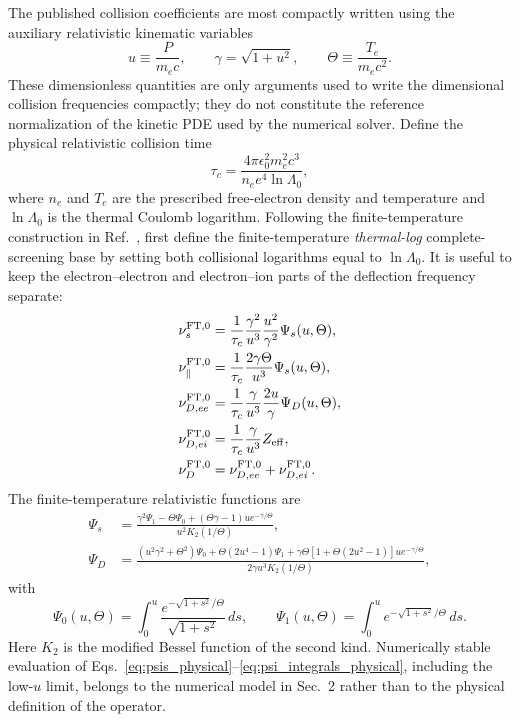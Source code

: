 \documentclass[11pt]{article}
\begin{document}
The published collision coefficients are most compactly written using the auxiliary
relativistic kinematic variables
\begin{equation}
 u\equiv\frac{P}{m_ec},
 \qquad
 \gamma=\sqrt{1+u^2},
 \qquad
 \Theta\equiv\frac{T_e}{m_ec^2}.
 \label{eq:collision_auxiliary_variables}
\end{equation}
These dimensionless quantities are only arguments used to write the dimensional collision
frequencies compactly; they do not constitute the reference normalization of the kinetic
PDE used by the numerical solver.  Define the physical relativistic collision time
\begin{equation}
 \tau_c
 =\frac{4\pi\epsilon_0^2m_e^2c^3}
 {n_e e^4\ln\Lambda_0},
 \label{eq:physical_collision_time}
\end{equation}
where $n_e$ and $T_e$ are the prescribed free-electron density and temperature and
$\ln\Lambda_0$ is the thermal Coulomb logarithm.  Following the finite-temperature
construction in Ref.~\cite{Hesslow2018Collision}, first define the finite-temperature
\emph{thermal-log} complete-screening base by setting both collisional logarithms equal
to $\ln\Lambda_0$.  It is useful to keep the electron--electron and electron--ion
parts of the deflection frequency separate:
\begin{align}
 \nu_s^{\rm FT,0}
 &=\frac{1}{\tau_c}\frac{\gamma^2}{u^3}
   \frac{u^2}{\gamma^2}\Psi_s(u,\Theta),
 \label{eq:physical_nus}\\
 \nu_\parallel^{\rm FT,0}
 &=\frac{1}{\tau_c}\frac{2\gamma\Theta}{u^3}\Psi_s(u,\Theta),
 \label{eq:physical_nupar}\\
 \nu_{D,ee}^{\rm FT,0}
 &=\frac{1}{\tau_c}\frac{\gamma}{u^3}
   \frac{2u}{\gamma}\Psi_D(u,\Theta),\\
 \nu_{D,ei}^{\rm FT,0}
 &=\frac{1}{\tau_c}\frac{\gamma}{u^3}Z_{\rm eff},\\
 \nu_D^{\rm FT,0}
 &=\nu_{D,ee}^{\rm FT,0}+\nu_{D,ei}^{\rm FT,0}.
 \label{eq:physical_nud}
\end{align}
The finite-temperature relativistic functions are
\begin{align}
 \Psi_s
 &=\frac{
   \gamma^2\Psi_1-\Theta\Psi_0
   +(\Theta\gamma-1)u e^{-\gamma/\Theta}}
  {u^2K_2(1/\Theta)},
 \label{eq:psis_physical}\\
 \Psi_D
 &=\frac{
  (u^2\gamma^2+\Theta^2)\Psi_0
  +\Theta(2u^4-1)\Psi_1
  +\gamma\Theta[1+\Theta(2u^2-1)]u e^{-\gamma/\Theta}}
  {2\gamma u^3K_2(1/\Theta)},
 \label{eq:psid_physical}
\end{align}
with
\begin{equation}
 \Psi_0(u,\Theta)
 =\int_0^u\frac{e^{-\sqrt{1+s^2}/\Theta}}{\sqrt{1+s^2}}\,ds,
 \qquad
 \Psi_1(u,\Theta)
 =\int_0^u e^{-\sqrt{1+s^2}/\Theta}\,ds.
 \label{eq:psi_integrals_physical}
\end{equation}
Here $K_2$ is the modified Bessel function of the second kind.  Numerically stable
evaluation of Eqs.~\eqref{eq:psis_physical}--\eqref{eq:psi_integrals_physical}, including
the low-$u$ limit, belongs to the numerical model in Sec.~2 rather than to the physical
definition of the operator.
\end{document}
